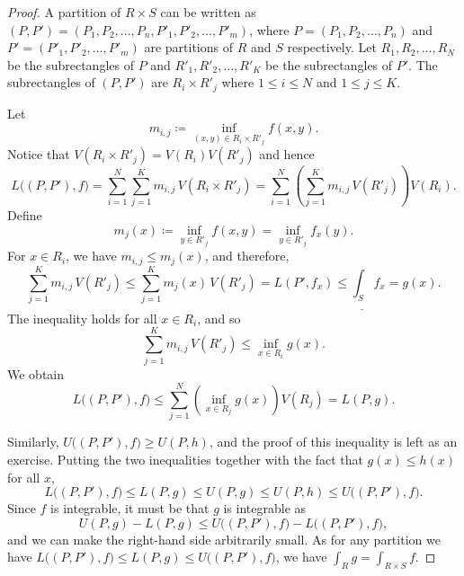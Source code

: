 \begin{proof}
A partition of $R \times S$ can be written as
$(P,P') = (P_1,P_2,\ldots,P_n,P'_1,P'_2,\ldots,P'_m)$,
where
$P = (P_1,P_2,\ldots,P_n)$ and
$P' = (P'_1,P'_2,\ldots,P'_m)$ are partitions of $R$ and $S$ respectively.
Let
$R_1,R_2,\ldots,R_N$ be the subrectangles of $P$ and
$R'_1,R'_2,\ldots,R'_K$ be the subrectangles of $P'$.
The subrectangles of $(P,P')$ are
$R_i \times R'_j$ where $1 \leq i \leq N$ and $1 \leq j \leq K$.

Let
\begin{equation*}
m_{i,j} \coloneqq
\inf_{(x,y) \in R_i \times R'_j} f(x,y) .
\end{equation*}
Notice that
$V(R_i \times R'_j) = V(R_i)V(R'_j)$ and hence
\begin{equation*}
L\bigl((P,P'),f\bigr) =
\sum_{i=1}^N
\sum_{j=1}^K
m_{i,j} \, V(R_i \times R'_j)
=
\sum_{i=1}^N
\left(
\sum_{j=1}^K
m_{i,j} \, V(R'_j) \right) V(R_i) .
\end{equation*}
Define
\begin{equation*}
m_j(x) \coloneqq \inf_{y \in R'_j} f(x,y) = \inf_{y \in R'_j} f_x(y) .
\end{equation*}
For $x \in R_i$, we have $m_{i,j} \leq m_j(x)$, and therefore,
\begin{equation*}
\sum_{j=1}^K
m_{i,j} \, V(R'_j)
\leq \sum_{j=1}^K m_j(x) \, V(R'_j) = L(P',f_x) \leq
\underline{\int_S} f_x = g(x) .
\end{equation*}
The inequality holds for all $x \in R_i$, and so
\begin{equation*}
\sum_{j=1}^K
m_{i,j} \, V(R'_j)
\leq \inf_{x \in R_i} g(x) .
\end{equation*}
We obtain
\begin{equation*}
L\bigl((P,P'),f\bigr) 
\leq
\sum_{j=1}^N
\left(
\inf_{x \in R_j} g(x)
\right) V(R_j) = L(P,g) .
\end{equation*}

Similarly, $U\bigl((P,P'),f\bigr) \geq U(P,h)$, and the proof of this inequality is
left as an exercise.
Putting the two inequalities together with the fact that $g(x) \leq h(x)$ for all $x$,
\begin{equation*}
L\bigl((P,P'),f\bigr)
\leq
L(P,g) \leq
U(P,g) \leq
U(P,h) \leq
U\bigl((P,P'),f\bigr) .
\end{equation*}
Since $f$ is integrable, it must be that $g$ is integrable as
\begin{equation*}
U(P,g) - L(P,g)
\leq
U\bigl((P,P'),f\bigr) -
L\bigl((P,P'),f\bigr) ,
\end{equation*}
and we can make the right-hand side arbitrarily small.
As for any partition we have 
$L\bigl((P,P'),f\bigr) \leq L(P,g) \leq U\bigl((P,P'),f\bigr)$, we have
$\int_R g = \int_{R \times S} f$.


\end{proof}
